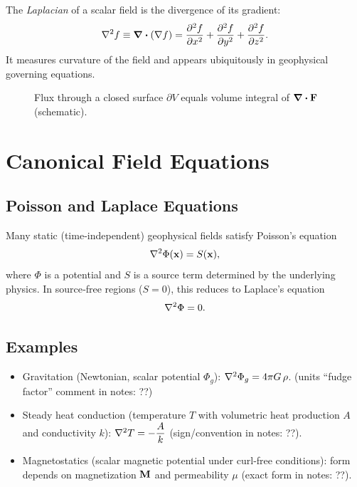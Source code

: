 \documentclass[11pt,a4paper]{article}
\begin{document}
The \emph{Laplacian} of a scalar field is the divergence of its gradient:
\begin{equation}
  \laplacian f \equiv \div (\nabla f) = \pdv[2]{f}{x} + \pdv[2]{f}{y} + \pdv[2]{f}{z} .
\end{equation}
It measures curvature of the field and appears ubiquitously in geophysical governing equations.

\begin{figure}[h]
  \centering
  \caption{Flux through a closed surface $\partial V$ equals volume integral of $\div {\vb{F}}$ (schematic).}
\end{figure}

\section{Canonical Field Equations}
\subsection{Poisson and Laplace Equations}
Many static (time‐independent) geophysical fields satisfy Poisson's equation
\begin{equation}
  \laplacian \Phi(\vb{x}) = S(\vb{x}) ,
\end{equation}
where $\Phi$ is a potential and $S$ is a source term determined by the underlying physics. In source‐free regions ($S=0$), this reduces to Laplace's equation
\begin{equation}
  \laplacian \Phi = 0 .
\end{equation}

\subsection{Examples}
\begin{itemize}
  \item Gravitation (Newtonian, scalar potential $\Phi_g$): \; $\laplacian \Phi_g = 4\pi G\,\rho$.  \; (units ``fudge factor'' comment in notes: ??)
  \item Steady heat conduction (temperature $T$ with volumetric heat production $A$ and conductivity $k$): \; $\laplacian T = -\dfrac{A}{k}$ (sign/convention in notes: ??).
  \item Magnetostatics (scalar magnetic potential under curl‐free conditions): \; form depends on magnetization $\vb{M}$ and permeability $\mu$ (exact form in notes: ??).
\end{itemize}
\end{document}
